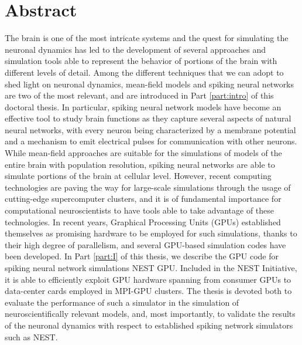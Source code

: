 \documentclass[a4paper, 12pt, twoside, openright]{book}
\begin{document}
\chapter*{\textbf{Abstract}}
The brain is one of the most intricate systems and the quest for simulating the neuronal dynamics has led to the development of several approaches and simulation tools able to represent the behavior of portions of the brain with different levels of detail. Among the different techniques that we can adopt to shed light on neuronal dynamics, mean-field models and spiking neural networks are two of the most relevant, and are introduced in Part \ref{part:intro} of this doctoral thesis. In particular, spiking neural network models have become an effective tool to study brain functions as they capture several aspects of natural neural networks, with every neuron being characterized by a membrane potential and a mechanism to emit electrical pulses for communication with other neurons. While mean-field approaches are suitable for the simulations of models of the entire brain with population resolution, spiking neural networks are able to simulate portions of the brain at cellular level. However, recent computing technologies are paving the way for large-scale simulations through the usage of cutting-edge supercomputer clusters, and it is of fundamental importance for computational neuroscientists to have tools able to take advantage of these technologies. In recent years, Graphical Processing Units (GPUs) established themselves as promising hardware to be employed for such simulations, thanks to their high degree of parallelism, and several GPU-based simulation codes have been developed. In Part \ref{part:I} of this thesis, we describe the GPU code for spiking neural network simulations NEST GPU. Included in the NEST Initiative, it is able to efficiently exploit GPU hardware spanning from consumer GPUs to data-center cards employed in MPI-GPU clusters. The thesis is devoted both to evaluate the performance of such a simulator in the simulation of neuroscientifically relevant models, and, most importantly, to validate the results of the neuronal dynamics with respect to established spiking network simulators such as NEST.
\end{document}
